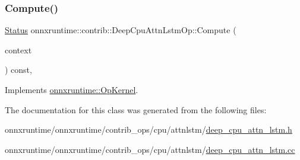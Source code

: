 \subsubsection{\texorpdfstring{Compute()}{Compute()}}
{\footnotesize\ttfamily \mbox{\hyperlink{classonnxruntime_1_1common_1_1Status}{Status}} onnxruntime\+::contrib\+::\+Deep\+Cpu\+Attn\+Lstm\+Op\+::\+Compute (\begin{DoxyParamCaption}\item[{\mbox{\hyperlink{classonnxruntime_1_1OpKernelContext}{Op\+Kernel\+Context}} $\ast$}]{context }\end{DoxyParamCaption}) const\hspace{0.3cm}{\ttfamily [override]}, {\ttfamily [virtual]}}



Implements \mbox{\hyperlink{classonnxruntime_1_1OpKernel_a9eca8656a78b1b3ab9d3351a12798650}{onnxruntime\+::\+Op\+Kernel}}.



The documentation for this class was generated from the following files\+:\begin{DoxyCompactItemize}
\item 
onnxruntime/onnxruntime/contrib\+\_\+ops/cpu/attnlstm/\mbox{\hyperlink{deep__cpu__attn__lstm_8h}{deep\+\_\+cpu\+\_\+attn\+\_\+lstm.\+h}}\item 
onnxruntime/onnxruntime/contrib\+\_\+ops/cpu/attnlstm/\mbox{\hyperlink{deep__cpu__attn__lstm_8cc}{deep\+\_\+cpu\+\_\+attn\+\_\+lstm.\+cc}}\end{DoxyCompactItemize}
